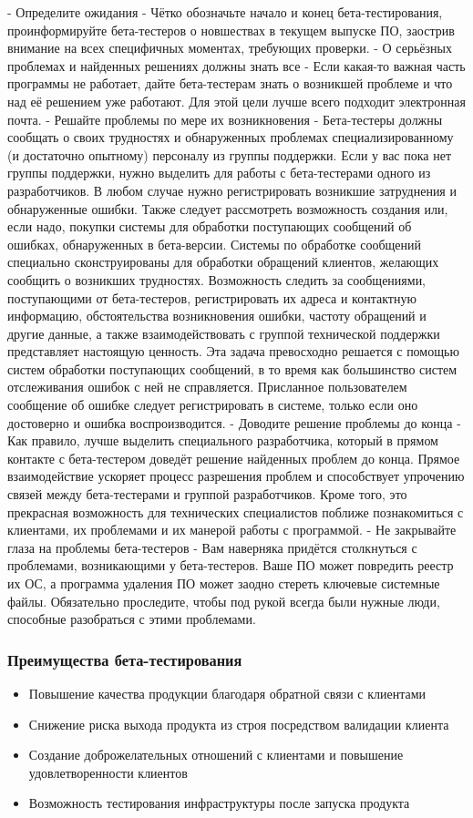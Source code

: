 \documentclass{../industrial-development}
\begin{document}
\lecturenotes
- Определите ожидания - Чётко обозначьте начало и конец бета-тестирования, проинформируйте бета-тестеров о новшествах в текущем выпуске ПО, заострив внимание на всех специфичных моментах, требующих проверки. 
- О серьёзных проблемах и найденных решениях должны знать все - Если какая-то важная часть программы не работает, дайте бета-тестерам знать о возникшей проблеме и что над её решением уже работают. Для этой цели лучше всего подходит электронная почта. 
- Решайте проблемы по мере их возникновения - Бета-тестеры должны сообщать о своих трудностях и обнаруженных проблемах специализированному (и достаточно опытному) персоналу из группы поддержки. Если у вас пока нет группы поддержки, нужно выделить для работы с бета-тестерами одного из разработчиков. В любом случае нужно регистрировать возникшие затруднения и обнаруженные ошибки. Также следует рассмотреть возможность создания или, если надо, покупки системы для обработки поступающих сообщений об ошибках, обнаруженных в бета-версии. Системы по обработке сообщений специально сконструированы для обработки обращений клиентов, желающих сообщить о возникших трудностях. Возможность следить за сообщениями, поступающими от бета-тестеров, регистрировать их адреса и контактную информацию, обстоятельства возникновения ошибки, частоту обращений и другие данные, а также взаимодействовать с группой технической поддержки представляет настоящую ценность. Эта задача превосходно решается с помощью систем обработки поступающих сообщений, в то время как большинство систем отслеживания ошибок с ней не справляется. Присланное пользователем сообщение об ошибке следует регистрировать в системе, только если оно достоверно и ошибка воспроизводится.
- Доводите решение проблемы до конца - Как правило, лучше выделить специального разработчика, который в прямом контакте с бета-тестером доведёт решение найденных проблем до конца. Прямое взаимодействие ускоряет процесс разрешения проблем и способствует упрочению связей между бета-тестерами и группой разработчиков. Кроме того, это прекрасная возможность для технических специалистов поближе познакомиться с клиентами, их проблемами и их манерой работы с программой.
- Не закрывайте глаза на проблемы бета-тестеров - Вам наверняка придётся столкнуться с проблемами, возникающими у бета-тестеров. Ваше ПО может повредить реестр их ОС, а программа удаления ПО может заодно стереть ключевые системные файлы. Обязательно проследите, чтобы под рукой всегда были нужные люди, способные разобраться с этими проблемами.

\begin{frame} \frametitle{Преимущества бета-тестирования}
	\begin{itemize}
		\item Повышение качества продукции благодаря обратной связи с клиентами
		\item Снижение риска выхода продукта из строя посредством валидации клиента
		\item Создание доброжелательных отношений с клиентами и повышение удовлетворенности клиентов
		\item Возможность тестирования инфраструктуры после запуска продукта
	\end{itemize}
\end{frame}
\end{document}
